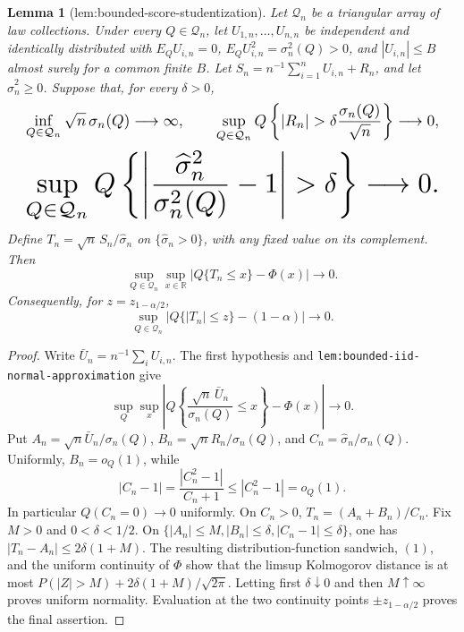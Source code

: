 \documentclass{article}
\newtheorem{lemma}{Lemma}
\begin{document}
\begin{lemma}[lem:bounded-score-studentization]\label{lem:bounded-score-studentization}
Let \(\mathcal Q_n\) be a triangular array of law collections. Under every \(Q\in\mathcal Q_n\), let \(U_{1,n},\ldots,U_{n,n}\) be independent and identically distributed with \(E_QU_{i,n}=0\), \(E_QU_{i,n}^2=\sigma_n^2(Q)>0\), and \(|U_{i,n}|\le B\) almost surely for a common finite \(B\). Let \(S_n=n^{-1}\sum_{i=1}^nU_{i,n}+R_n\), and let \(\widehat\sigma_n^2\ge0\). Suppose that, for every \(\delta>0\),
\[
\makebox[\linewidth][c]{\resizebox{0.98\linewidth}{!}{\par\noindent \makebox[\linewidth][c]{\resizebox{0.98\linewidth}{!}{\(\displaystyle \displaystyle \inf_{Q\in\mathcal Q_n}\sqrt n\,\sigma_n(Q)\longrightarrow\infty,\qquad \sup_{Q\in\mathcal Q_n}Q\left\{|R_n|>\delta\frac{\sigma_n(Q)}{\sqrt n}\right\}\longrightarrow0,\)}}\par\noindent}}
\]
\[
\makebox[\linewidth][c]{\resizebox{0.98\linewidth}{!}{\par\noindent \makebox[\linewidth][c]{\resizebox{0.98\linewidth}{!}{\(\displaystyle \displaystyle \sup_{Q\in\mathcal Q_n}Q\left\{\left|\frac{\widehat\sigma_n^2}{\sigma_n^2(Q)}-1\right|>\delta\right\}\longrightarrow0.\)}}\par\noindent}}
\]
Define \(T_n=\sqrt n\,S_n/\widehat\sigma_n\) on \(\{\widehat\sigma_n>0\}\), with any fixed value on its complement. Then
\[\sup_{Q\in\mathcal Q_n}\sup_{x\in\mathbb R}\left|Q\{T_n\le x\}-\Phi(x)\right|\longrightarrow0.\]
Consequently, for \(z=z_{1-\alpha/2}\),
\[\sup_{Q\in\mathcal Q_n}\left|Q\{|T_n|\le z\}-(1-\alpha)\right|\longrightarrow0.\]
\end{lemma}
\begin{proof}
Write \(\bar U_n=n^{-1}\sum_iU_{i,n}\). The first hypothesis and \texttt{lem:bounded-iid-normal-approximation} give
\[\sup_Q\sup_x\left|Q\left\{\frac{\sqrt n\,\bar U_n}{\sigma_n(Q)}\le x\right\}-\Phi(x)\right|\to0.\tag{1}\]
Put \(A_n=\sqrt n\bar U_n/\sigma_n(Q)\), \(B_n=\sqrt nR_n/\sigma_n(Q)\), and \(C_n=\widehat\sigma_n/\sigma_n(Q)\). Uniformly, \(B_n=o_Q(1)\), while
\[|C_n-1|=\frac{|C_n^2-1|}{C_n+1}\le |C_n^2-1|=o_Q(1).\tag{2}\]
In particular \(Q(C_n=0)\to0\) uniformly. On \(C_n>0\), \(T_n=(A_n+B_n)/C_n\). Fix \(M>0\) and \(0<\delta<1/2\). On \(\{|A_n|\le M,|B_n|\le\delta,|C_n-1|\le\delta\}\), one has \(|T_n-A_n|\le2\delta(1+M)\). The resulting distribution-function sandwich, \((1)\), and the uniform continuity of \(\Phi\) show that the limsup Kolmogorov distance is at most \(P(|Z|>M)+2\delta(1+M)/\sqrt{2\pi}\). Letting first \(\delta\downarrow0\) and then \(M\uparrow\infty\) proves uniform normality. Evaluation at the two continuity points \(\pm z_{1-\alpha/2}\) proves the final assertion.
\end{proof}
\end{document}
